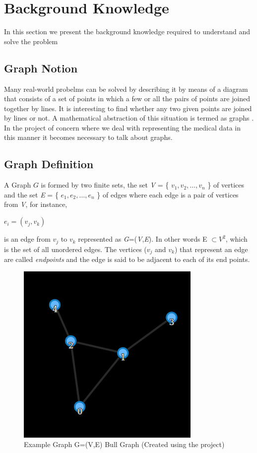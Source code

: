 \chapter{Background Knowledge}
In this section we present the background knowledge required to understand and solve the problem
\section{Graph Notion}
Many real-world probelms can be solved by describing it by means of a diagram that consists of a set of points in which a few or all the pairs of points are joined together by lines. It is interesting to find whether any two given points are joined by lines or not. A mathematical abstraction of this situation is termed as graphs 
\cite{BondyNMurthy}. In the project of concern where we deal with representing the medical data in this manner it becomes necessary to talk about graphs.

\section{Graph Definition}
A Graph $G$ is formed by two finite sets, the set \textit{V} = \{ $v_1,v_2, \ldots ,v_n$ \} of vertices and the set \textit{E} = \{ $e_1,e_2, \ldots,e_n$  \} of edges where each edge is a pair of vertices from \textit{V}, for instance,
\begin{center}
$e_i = (v_j,v_k)$
\end{center}
is an edge from $v_j$ to $v_k$ represented as \textit{G}=(\textit{V},\textit{E}). In other words  E $\subset V^2$, which is the set of all unordered edges. The vertices ($v_j$ and $v_k$) that represent an edge are called \textit{endpoints} and the edge is said to be adjacent to each of its end points.
\begin{figure}[h]
\centering
\includegraphics[scale=0.5]{bull.png}
\caption{Example Graph G=(V,E) Bull Graph (Created using the project)}
\end{figure}

